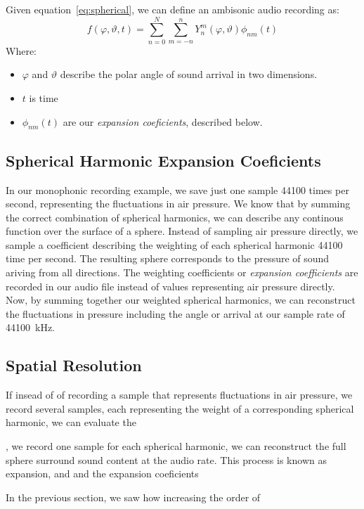 Given equation~\ref{eq:spherical}, we can define an ambisonic
audio recording as:
\begin{equation}
f(\varphi,\vartheta,t)=\sum\limits_{n=0}^N\sum\limits_{m=-n}^nY_n^m(\varphi,\vartheta)\phi_{nm}(t)
\label{eq:ambisonics}
\end{equation}
Where:
\begin{itemize}
\item $\varphi$ and $\vartheta$ describe the polar angle of sound
  arrival in two dimensions.
\item $t$ is time
\item $\phi_{nm}(t)$ are our \textit{expansion coeficients}, described
  below.
\end{itemize}

\subsection{Spherical Harmonic Expansion Coeficients}
\label{sec:spher-harm-expans}
In our monophonic recording example, we save just one sample 44100
times per second, representing the fluctuations in air pressure. We
know that by summing the correct combination of spherical harmonics,
we can describe any continous function over the surface of a
sphere. Instead of sampling air pressure directly, we sample a
coefficient describing the weighting of each spherical harmonic 44100
time per second. The resulting sphere corresponds to the pressure of
sound ariving from all directions. The weighting coefficients or
\textit{expansion coefficients} are recorded in our audio file instead
of values representing air pressure directly. Now, by summing together
our weighted spherical harmonics, we can reconstruct the fluctuations
in pressure including the angle or arrival at our sample rate of 44100~kHz.

\subsection{Spatial Resolution}
\label{sec:spatial-resolution}



If insead of 
of recording a sample that represents fluctuations in air pressure, we
record several samples, each representing the weight of a
corresponding spherical harmonic, we can evaluate the 


, we record one sample for each spherical harmonic, we
can reconstruct the full sphere surround sound content at the audio
rate. This process is known as expansion, and and the expansion
coeficients

In the previous section, we saw how increasing the order of 


